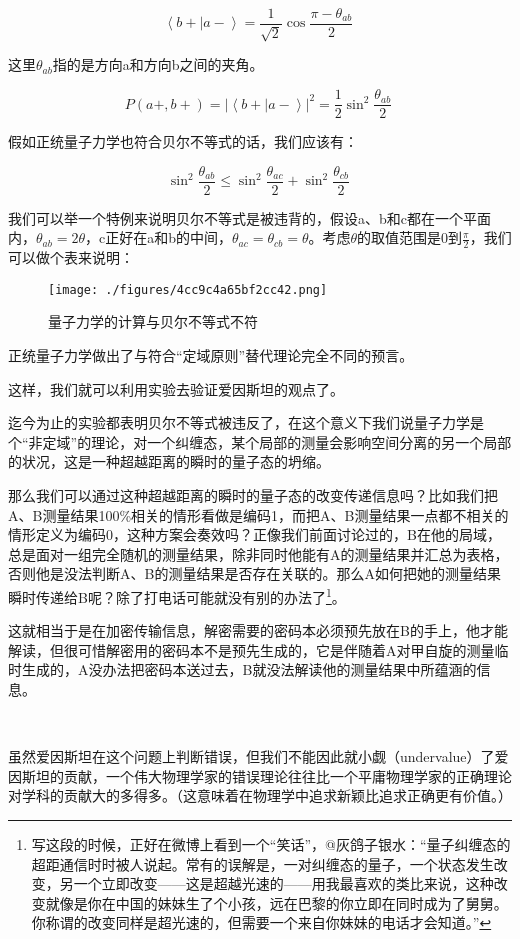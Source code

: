 \begin{equation}
\left\langle {b+} | {a-} \right\rangle = \frac{1}{\sqrt{2}} \cos \frac{\pi - \theta_{ab}}{2}~
\end{equation}

这里$\theta_{ab}$指的是方向a和方向b之间的夹角。

\begin{equation}
P(a+, b+) = \left| {\left\langle {b+} | {a-} \right\rangle} \right|^2 = \frac{1}{2} \sin^2 \frac{\theta_{ab}}{2}~
\end{equation}

假如正统量子力学也符合贝尔不等式的话，我们应该有：

\begin{equation}
\sin^2 \frac{\theta_{ab}}{2} \le \sin^2 \frac{\theta_{ac}}{2} + \sin^2 \frac{\theta_{cb}}{2}~
\end{equation}

我们可以举一个特例来说明贝尔不等式是被违背的，假设a、b和c都在一个平面内，$\theta_{ab} = 2 \theta$，c正好在a和b的中间，$\theta_{ac} = \theta_{cb} = \theta$。考虑$\theta$的取值范围是0到$\frac{\pi}{2}$，我们可以做个表来说明：

\begin{figure}[ht]
\centering
\texttt{[image: ./figures/4cc9c4a65bf2cc42.png]}
\caption{量⼦⼒学的计算与贝尔不等式不符} \label{fig_QMPre3_10}
\end{figure}

正统量子力学做出了与符合“定域原则”替代理论完全不同的预言。

这样，我们就可以利用实验去验证爱因斯坦的观点了。

迄今为止的实验都表明贝尔不等式被违反了，在这个意义下我们说量子力学是个“非定域”的理论，对一个纠缠态，某个局部的测量会影响空间分离的另一个局部的状况，这是一种超越距离的瞬时的量子态的坍缩。

那么我们可以通过这种超越距离的瞬时的量子态的改变传递信息吗？比如我们把A、B测量结果100\%相关的情形看做是编码1，而把A、B测量结果一点都不相关的情形定义为编码0，这种方案会奏效吗？正像我们前面讨论过的，B在他的局域，总是面对一组完全随机的测量结果，除非同时他能有A的测量结果并汇总为表格，否则他是没法判断A、B的测量结果是否存在关联的。那么A如何把她的测量结果瞬时传递给B呢？除了打电话可能就没有别的办法了\footnote{写这段的时候，正好在微博上看到一个“笑话”，@灰鸽子银水：“量子纠缠态的超距通信时时被人说起。常有的误解是，一对纠缠态的量子，一个状态发生改变，另一个立即改变——这是超越光速的——用我最喜欢的类比来说，这种改变就像是你在中国的妹妹生了个小孩，远在巴黎的你立即在同时成为了舅舅。你称谓的改变同样是超光速的，但需要一个来自你妹妹的电话才会知道。”}。

这就相当于是在加密传输信息，解密需要的密码本必须预先放在B的手上，他才能解读，但很可惜解密用的密码本不是预先生成的，它是伴随着A对甲自旋的测量临时生成的，A没办法把密码本送过去，B就没法解读他的测量结果中所蕴涵的信息。

~

虽然爱因斯坦在这个问题上判断错误，但我们不能因此就小觑（undervalue）了爱因斯坦的贡献，一个伟大物理学家的错误理论往往比一个平庸物理学家的正确理论对学科的贡献大的多得多。（这意味着在物理学中追求新颖比追求正确更有价值。）